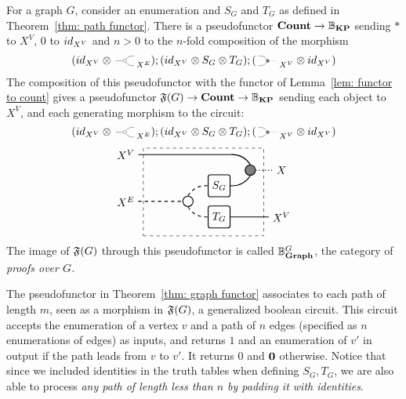 \documentclass[preliminary,copyright,creativecommons,sharealike,noncommercial]{eptcs}
\begin{document}
\begin{theorem}\label{thm: graph functor}
  For a graph $G$, consider an enumeration and $S_G$ and $T_G$ 
  as defined in Theorem~\ref{thm: path functor}. There is a pseudofunctor 
  $\textbf{Count} \to \mathbb{B}_\textbf{KP}$ sending $*$ to $X^V$, $0$ to $id_{X^V}$ 
  and $n > 0$ to the $n$-fold composition of the morphism
  \begin{equation*}
      (\Id{X^V} \Tensor \COPYSym_{X^E});
      (\Id{X^V} \Tensor S_G \Tensor T_G);(\MATCHSym_{X^V} \Tensor \Id{X^V})
  \end{equation*}
  The composition of this pseudofunctor with the functor of 
  Lemma~\ref{lem: functor to count} gives a pseudofunctor 
  $\mathfrak{F}(G) \to \textbf{Count} \to \mathbb{B}_\textbf{KP}$ sending each object to $X^V$, and each 
  generating morphism to the circuit:
  \begin{equation*}
    (\Id{X^V} \Tensor \COPYSym_{X^E});
      (\Id{X^V} \Tensor S_G \Tensor T_G);(\MATCHSym_{X^V} \Tensor \Id{X^V})
  \end{equation*}
  \begin{equation*}
    \begin{tikzpicture}
      \node[draw, circle, radius=5pt, thick] (copy) at (-1,0.5) {};
      \node[draw, minimum height=20, minimum width=20, rounded corners=2, thick] (S) at (0,1) {$S_G$};
      \node[draw, minimum height=20, minimum width=20, rounded corners=2, thick] (T) at (0,0) {$T_G$};
      \node[draw, fill=gray, circle, radius=5pt, thick] (mat) at (1,1.5) {};

      \node[draw, dashed, minimum height=80, minimum width=110] (contour) at (-0.5,0.8) {};

      \node (Xv) at (-3,2) {$X^V$};
      \node (Xe) at (-3,0.5) {$X^E$};
      \node (X) at (2,1.5) {$X$};
      \node (Xv2) at (2,0) {$X^V$};

      \draw[-, thick] (Xv) to (10pt,2);
      \draw[bend left, thick] (10pt,2) to (mat.north);
      \draw[bend right, thick] (S.east) to (mat.south);

      \draw[dashed, -, thick] (Xe) to (copy.west);

      \draw[dashed, bend left, thick] (copy.north) to (S.west);
      \draw[dashed, bend right, thick] (copy.south) to (T.west);

      \draw[-, dotted, thick] (mat.east) -- (X);
      \draw[-, thick] (T.east) -- (Xv2.west);
    \end{tikzpicture}
  \end{equation*}
  The image of $\mathfrak{F}(G)$ through this pseudofunctor 
  is called $\mathbb{B}^{G}_{\textbf{Graph}}$, the category of \emph{proofs over $G$.}
\end{theorem}
%
The pseudofunctor in Theorem~\ref{thm: graph functor} 
associates to each path of length $m$, seen as a morphism 
in $\mathfrak{F}(G)$, a generalized boolean circuit. 
This circuit accepts the enumeration of a vertex $v$ 
and a path of $n$ edges (specified as $n$ enumerations 
of edges) as inputs, and returns $1$ and an enumeration of $v'$
in output if the path leads from $v$ to $v'$. It returns $0$ and 
$\textbf{0}$ otherwise. Notice that since we included identities 
in the truth tables when defining $S_G, T_G$, we are also 
able to process \emph{any path of length less than $n$ by 
padding it with identities}.
%
%
%
\end{document}

